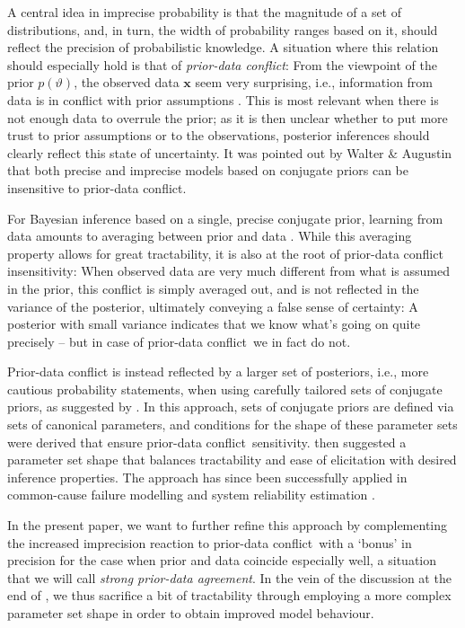 \documentclass[runningheads,a4paper]{llncs}
\def\pdc{prior-data conflict}
\renewcommand{\vec}[1]{{\bm #1}}
\begin{document}
A central idea in imprecise probability is that the magnitude of a set of distributions,
and, in turn, the width of probability ranges based on it,
should reflect the precision of probabilistic knowledge.
A situation where this relation should especially hold is that of \emph{\pdc}:
From the viewpoint of the prior $p(\vartheta)$, the observed data $\vec{x}$ seem very surprising,
i.e., information from data is in conflict with prior assumptions \cite[see, e.g.,][]{2006:evans}.
This is most relevant when there is not enough data to overrule the prior;
as it is then unclear whether to put more trust to prior assumptions or to the observations,
posterior inferences should clearly reflect this state of uncertainty.
It was pointed out by Walter \& Augustin \cite{Walter2009a} that
both precise and imprecise models based on conjugate priors can be insensitive to prior-data conflict.

For Bayesian inference based on a single, precise conjugate prior,
learning from data amounts to averaging between prior and data
\cite[see, e.g.,][\S~1.2.3.1]{2013:diss-gw}.
While this averaging property allows for great tractability,
it is also at the root of prior-data conflict insensitivity: 
When observed data are very much different from what is assumed in the prior,
this conflict is simply averaged out,
and is not reflected in the variance of the posterior,
ultimately conveying a false sense of certainty:
A posterior with small variance indicates that we know what's going on quite precisely -- but in case of \pdc\ we in fact do not.

Prior-data conflict is instead reflected by a larger set of posteriors,
i.e., more cautious probability statements,
when using carefully tailored sets of conjugate priors,
as suggested by \cite{Walter2009a}.
In this approach, sets of conjugate priors are defined via sets of canonical parameters,
and conditions for the shape of these parameter sets were derived that ensure \pdc\ sensitivity.
\cite{Walter2009a} then suggested a parameter set shape
that balances tractability and ease of elicitation
with desired inference properties.
The approach has since been successfully applied in common-cause failure modelling \cite{Troffaes2014a}
and system reliability estimation \cite{2015:walter}.

In the present paper, we want to further refine this approach
by complementing the increased imprecision reaction to \pdc\
with a `bonus' in precision for the case when prior and data coincide especially well,
a situation that we will call \emph{strong prior-data agreement}.
In the vein of the discussion at the end of \cite[\S~3.1.4]{2013:diss-gw},
we thus sacrifice a bit of tractability through employing a more complex parameter set shape
in order to obtain improved model behaviour.%
\end{document}
